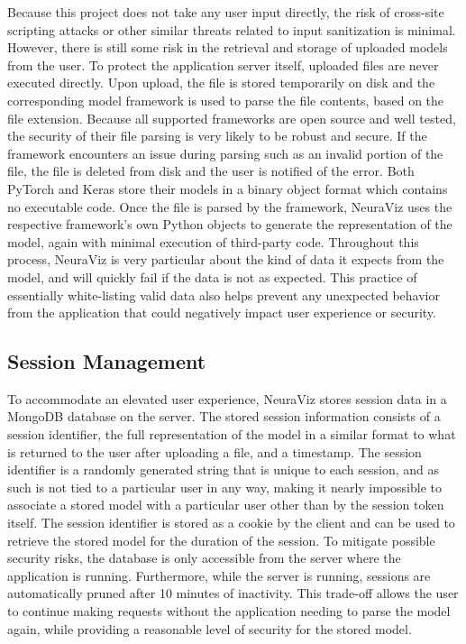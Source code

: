 Because this project does not take any user input directly, the risk of cross-site scripting attacks or other similar threats related to input sanitization is minimal. However, there is still some risk in the retrieval and storage of uploaded models from the user. To protect the application server itself, uploaded files are never executed directly. Upon upload, the file is stored temporarily on disk and the corresponding model framework is used to parse the file contents, based on the file extension. Because all supported frameworks are open source and well tested, the security of their file parsing is very likely to be robust and secure. If the framework encounters an issue during parsing such as an invalid portion of the file, the file is deleted from disk and the user is notified of the error. Both PyTorch and Keras store their models in a binary object format which contains no executable code. Once the file is parsed by the framework, NeuraViz uses the respective framework's own Python objects to generate the representation of the model, again with minimal execution of third-party code. Throughout this process, NeuraViz is very particular about the kind of data it expects from the model, and will quickly fail if the data is not as expected. This practice of essentially white-listing valid data also helps prevent any unexpected behavior from the application that could negatively impact user experience or security.

\subsection{Session Management}
To accommodate an elevated user experience, NeuraViz stores session data in a MongoDB database on the server. The stored session information consists of a session identifier, the full representation of the model in a similar format to what is returned to the user after uploading a file, and a timestamp. The session identifier is a randomly generated string that is unique to each session, and as such is not tied to a particular user in any way, making it nearly impossible to associate a stored model with a particular user other than by the session token itself. The session identifier is stored as a cookie by the client and can be used to retrieve the stored model for the duration of the session. To mitigate possible security risks, the database is only accessible from the server where the application is running. Furthermore, while the server is running, sessions are automatically pruned after 10 minutes of inactivity. This trade-off allows the user to continue making requests without the application needing to parse the model again, while providing a reasonable level of security for the stored model.
